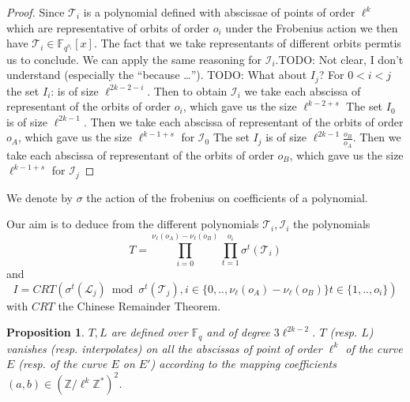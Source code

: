 \documentclass{lms}
\newcommand{\todo}[1]{{\color{red}TODO: #1}}
\newtheorem{prop}[thm]{Proposition}
\begin{document}
\begin{proof}
  Since $\mathcal{T}_i$ is a polynomial defined with abscissae of
  points of order $\ell^k$  which are representative of orbits of order $o_i$ under the Frobenius action  we then have $\mathcal{T}_i \in \mathbb{F}_{q^{o_i}}[x]$. The fact that we take representants of different orbits permtis us to conclude. We can apply the same reasoning for $\mathcal{I}_i$.\todo{Not clear, I don't understand
    (especially the ``because \dots'').} \todo{What about $I_j$?}
    \newline
For $0 < i < j$ the set $I_i$: is of size $\ell^{2k-2-i}$. Then to obtain $\mathcal{I}_i$ we take each abscissa of representant of the orbits of order $o_i$, which gave us the size $\ell^{k-2+s}$
\newline
The set $I_0$ is of size $\ell^{2k-1}$. Then we take each abscissa of representant of the orbits of order $o_A$, which gave us the size $\ell^{k-1+s}$ for $\mathcal{I}_0$
\newline
The set $I_j$ is of size $\ell^{2k-1} \frac{o_B}{o_A}$. Then we take each abscissa of representant of the orbits of order $o_B$, which gave us the size $\ell^{k-1+s}$   for $\mathcal{I}_j$
\end{proof}

\begin{defi}
We denote by $\sigma$ the action of the frobenius on coefficients of a polynomial.
\end{defi}

Our aim is to deduce from the different polynomials $\mathcal{T}_i,
\mathcal{I}_i$ the polynomials
$$T=\prod_{i=0}^{\nu_{\ell}(o_A)-\nu_{\ell}(o_B)}\prod_{t=1}^{o_i}\sigma^{t}(\mathcal{T}_i)$$ 
and
$$I= CRT(\sigma^{t}(\mathcal{L}_j) \bmod \sigma^{t}(\mathcal{T}_j), i\in \{ 0,.., \nu_{\ell}(o_A)-\nu_{\ell}(o_B) \}  t \in \{ 1,..,o_i \} )$$
with $CRT$ the Chinese Remainder Theorem.

\begin{prop}
$T ,L $ are defined over $\mathbb{F}_q$ and of degree $3\ell^{2k-2}$. $T$ (resp. $L$) vanishes (resp. interpolates) on all the abscissas of point of order $\ell^k$ of the curve $E$ (resp. of the curve $E$ on $E'$) according to the mapping coefficients $(a,b) \in \left( \mathbb{Z}/ \ell^k \mathbb{Z} ^* \right)^2$.  
\end{prop}
\end{document}
